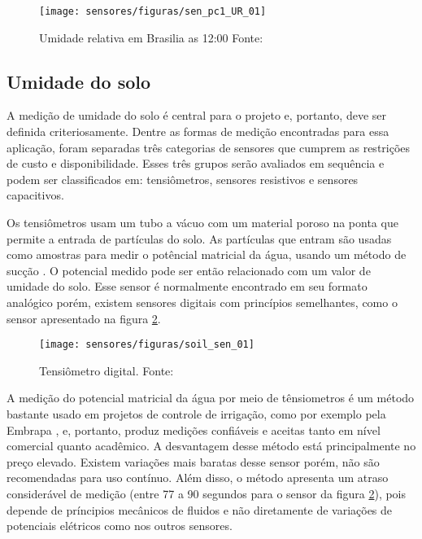 	\begin{figure}[H]
		\centering
		\texttt{[image: sensores/figuras/sen\_pc1\_UR\_01]}
		\caption{Umidade relativa em Brasilia as 12:00 Fonte: \cite{bib_sen_03_inmet_UR}}
		\label{sen_pc1_UR_01}
	\end{figure}

	\subsection{Umidade do solo}

	A medição de umidade do solo é central para o projeto e, portanto, deve ser definida criteriosamente. Dentre as formas de medição encontradas para essa aplicação, foram separadas três categorias de sensores que cumprem as restrições de custo e disponibilidade. Esses três grupos serão avaliados em sequência e podem ser classificados em: tensiômetros, sensores resistivos e sensores capacitivos.
	
	Os tensiômetros usam um tubo a vácuo com um material poroso na ponta que permite a entrada de partículas do solo. As partículas que entram são usadas como amostras para medir o potêncial matricial da água, usando um método de sucção \cite{bib_soil_sen_emb_01}. O potencial medido pode ser então relacionado com um valor de umidade do solo. Esse sensor é normalmente encontrado em seu formato analógico porém, existem sensores digitais com princípios semelhantes, como o sensor apresentado na figura \ref{soil_sen_01}. 
	
	\begin{figure}[H]
		\centering
		\texttt{[image: sensores/figuras/soil\_sen\_01]}
		\caption{Tensiômetro digital. Fonte: \cite{bib_soil_sen_01}}
		\label{soil_sen_01}
	\end{figure}

	A medição do potencial matricial da água por meio de tênsiometros é um método bastante usado em projetos de controle de irrigação, como por exemplo pela Embrapa \cite{bib_soil_sen_emb_02}, e, portanto, produz medições confiáveis e aceitas tanto em nível comercial quanto acadêmico. A desvantagem desse método está principalmente no preço elevado. Existem variações mais baratas desse sensor porém, não são recomendadas para uso contínuo. Além disso, o método apresenta um atraso considerável de medição (entre 77 a 90 segundos para o sensor da figura \ref{soil_sen_01}), pois depende de príncipios mecânicos de fluidos e não diretamente de variações de potenciais elétricos como nos outros sensores.
	
